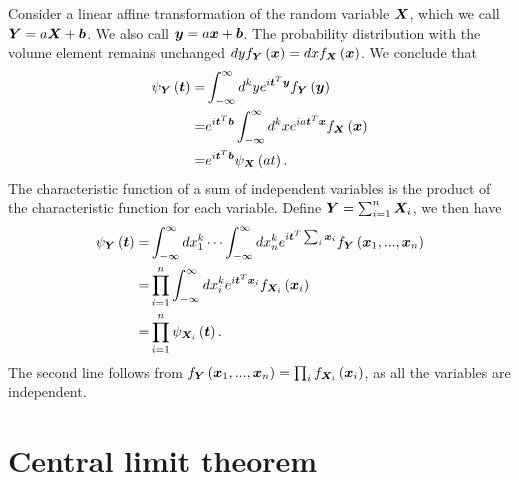 Consider a linear affine transformation of the random variable ${\bm X}$,
which we call ${\bm Y} = a{\bm X} + {\bm b}$. We also call ${\bm y} = a{\bm x} + {\bm b}$.
The probability distribution with the volume element remains unchanged 
$dy f_{{\bm Y}}\left({\bm x}\right)
    =
    dx f_{{\bm X}}\left({\bm x}\right)
    $.
We conclude that
\begin{align}
    \psi_{{\bm Y}}\left({\bm t}\right)
    =&
    \int_{-\infty}^{\infty} d^ky e^{i{\bm t}^T{\bm y}} f_{{\bm Y}}\left({\bm y}\right)
    \nonumber\\
    =&
    e^{i{\bm t}^T{\bm b}}\int_{-\infty}^{\infty} d^kx e^{ia{\bm t}^T{\bm x}} f_{{\bm X}}\left({\bm x}\right)
    \nonumber\\
    =&
    e^{i{\bm t}^T{\bm b}}\psi_{{\bm X}}\left(at\right)
    .
\end{align}
The characteristic function of a sum of independent variables 
is the product of the characteristic function for each variable.
Define ${\bm Y} = \sum_{i=1}^n {\bm X}_i$, we then have
\begin{align}
    \psi_{{\bm Y}}\left({\bm t}\right)
    =&
    \int_{-\infty}^{\infty} dx^k_1\cdots \int_{-\infty}^{\infty} dx^k_n 
        e^{i{\bm t}^T\sum_i{\bm x}_i} f_{{\bm Y}}\left({\bm x}_1,...,{\bm x}_n\right)  
    \nonumber\\
    =&
    \prod_{i=1}^n \int_{-\infty}^{\infty} dx^k_i e^{i{\bm t}^T{\bm x}_i} f_{{\bm X}_i}\left({\bm x}_i\right)
    \nonumber\\
    =&
    \prod_{i=1}^n \psi_{{\bm X}_i}\left({\bm t}\right) 
    .
\end{align}
The second line follows from 
$f_{{\bm Y}}\left({\bm x}_1,...,{\bm x}_n\right)=\prod_i f_{{\bm X}_i}\left({\bm x}_i\right)$,
as all the variables are independent.


\section{Central limit theorem}

